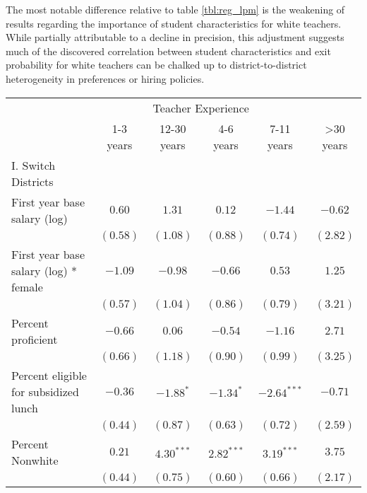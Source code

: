 \documentclass[]{article}
\begin{document}
The most notable difference relative to table \ref{tbl:reg_lpm} is the
weakening of results regarding the importance of student characteristics
for white teachers. While partially attributable to a decline in
precision, this adjustment suggests much of the discovered correlation
between student characteristics and exit probability for white teachers
can be chalked up to district-to-district heterogeneity in preferences
or hiring policies.

\begin{table}
\begin{center}
\begin{tabular}{l c c c c c }
\hline
 & \multicolumn{4}{c}{Teacher Experience} \\ \cline{2-6}
 & 1-3 years & 12-30 years & 4-6 years & 7-11 years & >30 years \\
\hline
I. Switch Districts                             &              &              &               &               &             \\
\quad First year base salary (log)           & $0.60$       & $1.31$       & $0.12$        & $-1.44$       & $-0.62$     \\
                                                & $(0.58)$     & $(1.08)$     & $(0.88)$      & $(0.74)$      & $(2.82)$    \\
\quad First year base salary (log) * female  & $-1.09$      & $-0.98$      & $-0.66$       & $0.53$        & $1.25$      \\
                                                & $(0.57)$     & $(1.04)$     & $(0.86)$      & $(0.79)$      & $(3.21)$    \\
\quad Percent proficient                     & $-0.66$      & $0.06$       & $-0.54$       & $-1.16$       & $2.71$      \\
                                                & $(0.66)$     & $(1.18)$     & $(0.90)$      & $(0.99)$      & $(3.25)$    \\
\quad Percent eligible for subsidized lunch  & $-0.36$      & $-1.88^{*}$  & $-1.34^{*}$   & $-2.64^{***}$ & $-0.71$     \\
                                                & $(0.44)$     & $(0.87)$     & $(0.63)$      & $(0.72)$      & $(2.59)$    \\
\quad Percent Nonwhite                       & $0.21$       & $4.30^{***}$ & $2.82^{***}$  & $3.19^{***}$  & $3.75$      \\
                                                & $(0.44)$     & $(0.75)$     & $(0.60)$      & $(0.66)$      & $(2.17)$    \\

\end{tabular}
\end{center}
\end{table}
\end{document}
